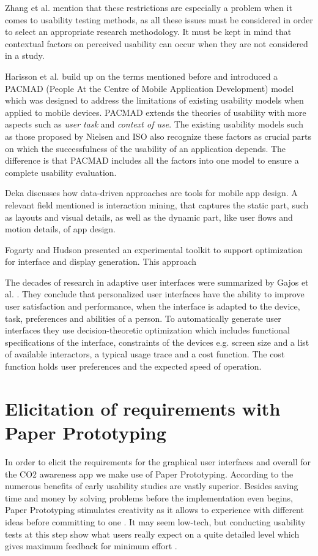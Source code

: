 Zhang et al. mention that these restrictions are especially a problem when it comes to usability testing methods, as all these issues must be considered in order to select an appropriate research methodology. It must be kept in mind that contextual factors on perceived usability can occur when they are not considered in a study.

Harisson et al. \cite{harrison2013usability} build up on the terms mentioned before and introduced a PACMAD (People At the Centre of Mobile Application Development) model which was designed to address the limitations of existing usability models when applied to mobile devices. PACMAD extends the theories of usability with more aspects such as \textit{user task} and \textit{context of use}. The existing usability models such as those proposed by Nielsen \cite{nielsen1994usability} and ISO \cite{bevan1998iso} also recognize these factors as crucial parts on which the successfulness of the usability of an application depends. The difference is that PACMAD includes all the factors into one model to ensure a complete usability evaluation.

Deka \cite{deka2016data} discusses how data-driven approaches are tools for mobile app design. A relevant field mentioned is interaction mining, that captures the static part, such as layouts and visual details, as well as the dynamic part, like user flows and motion details, of app design.

Fogarty and Hudson \cite{fogarty2003gadget} presented an experimental toolkit to support optimization for interface and display generation. This approach


The decades of research in adaptive user interfaces were summarized by Gajos et al. \cite{gajos2008decision}. They conclude that personalized user interfaces have the ability to improve user satisfaction and performance, when the interface is adapted to the device, task, preferences and abilities of a person. To automatically generate user interfaces they use decision-theoretic optimization which includes functional specifications of the interface, constraints of the devices e.g. screen size and a list of available interactors, a typical usage trace and a cost function. The cost function holds user preferences and the expected speed of operation.

\section{Elicitation of requirements with Paper Prototyping}
In order to elicit the requirements for the graphical user interfaces and overall for the CO2 awareness app we make use of Paper Prototyping. According to \cite{lancaster2004paper} the numerous benefits of early usability studies are vastly superior. Besides saving time and money by solving problems before the implementation even begins, Paper Prototyping stimulates creativity as it allows to experience with different ideas before committing to one \cite{snyder2003paper}. It may seem low-tech, but conducting usability tests at this step show what users really expect on a quite detailed level which gives maximum feedback for minimum effort \cite{weiss2003handheld}. 

